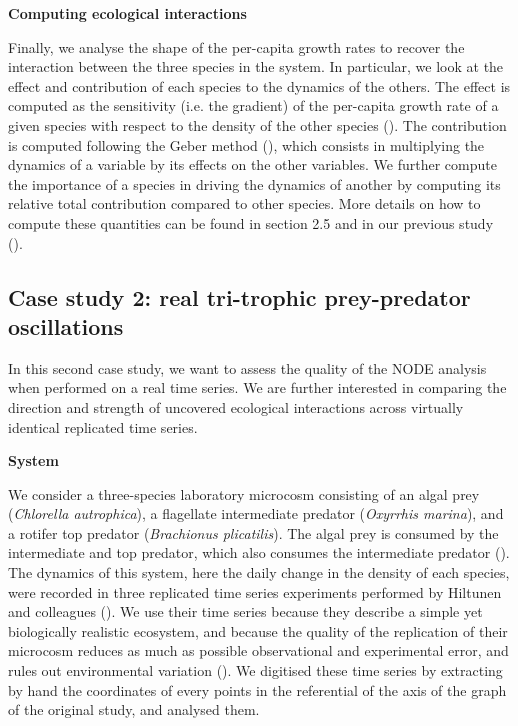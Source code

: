 \documentclass[11pt, oneside]{article}
\begin{document}
\textbf{Computing ecological interactions}

Finally, we analyse the shape of the per-capita growth rates to recover the interaction between the three species in the system.
In particular, we look at the effect and contribution of each species to the dynamics of the others.
The effect is computed as the sensitivity (i.e. the gradient) of the per-capita growth rate of a given species with respect to the density of the other species (\cite{Sugihara2012,Bonnaffe2021a}).
The contribution is computed following the Geber method (\cite{Hairston2005}), which consists in multiplying the dynamics of a variable by its effects on the other variables.
We further compute the importance of a species in driving the dynamics of another by computing its relative total contribution compared to other species.
More details on how to compute these quantities can be found in section 2.5 and in our previous study (\cite{Bonnaffe2021a}).

\subsection{Case study 2: real tri-trophic prey-predator oscillations}

In this second case study, we want to assess the quality of the NODE analysis when performed on a real time series.
We are further interested in comparing the direction and strength of uncovered ecological interactions across virtually identical replicated time series.

\textbf{System}

We consider a three-species laboratory microcosm consisting of an algal prey (\textit{Chlorella autrophica}), a flagellate intermediate predator (\textit{Oxyrrhis marina}), and a rotifer top predator (\textit{Brachionus plicatilis}).
The algal prey is consumed by the intermediate and top predator, which also consumes the intermediate predator (\cite{Arndt1993}).
The dynamics of this system, here the daily change in the density of each species, were recorded in three replicated time series experiments performed by Hiltunen and colleagues (\cite{Hiltunen2013}). 
We use their time series because they describe a simple yet biologically realistic ecosystem, and because the quality of the replication of their microcosm reduces as much as possible observational and experimental error, and rules out environmental variation (\cite{Hiltunen2013}).
We digitised these time series by extracting by hand the coordinates of every points in the referential of the axis of the graph of the original study, and analysed them.
\end{document}
